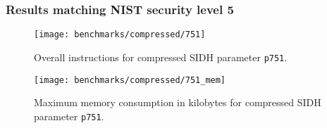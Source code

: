 %
%
%

\subsubsection{Results matching NIST security level 5}
\begin{figure}[H]
  \centering
  \texttt{[image: benchmarks/compressed/751]}
  \caption[Overall instructions compressed p751]
  {Overall instructions for compressed SIDH parameter \texttt{p751}.}
  \label{fig:results_comp_751}
\end{figure}

\begin{figure}[H]
  \centering
  \texttt{[image: benchmarks/compressed/751\_mem]}
  \caption[Maximum memory consumption compressed p751]
  {Maximum memory consumption in kilobytes for compressed SIDH parameter \texttt{p751}.}
  \label{fig:results_comp_751_mem}
\end{figure}

